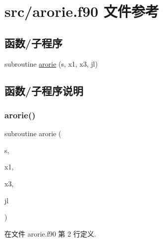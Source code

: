 \hypertarget{arorie_8f90}{}\section{src/arorie.f90 文件参考}
\label{arorie_8f90}
\subsection*{函数/子程序}
\begin{DoxyCompactItemize}
\item 
subroutine \mbox{\hyperlink{arorie_8f90_a9bf3ea44d55ee6d65228f6605eccd9fb}{arorie}} (s, x1, x3, jl)
\end{DoxyCompactItemize}


\subsection{函数/子程序说明}
\mbox{\label{arorie_8f90_a9bf3ea44d55ee6d65228f6605eccd9fb}} 
\subsubsection{\texorpdfstring{arorie()}{arorie()}}
{\footnotesize\ttfamily subroutine arorie (\begin{DoxyParamCaption}\item[{}]{s,  }\item[{}]{x1,  }\item[{}]{x3,  }\item[{}]{jl }\end{DoxyParamCaption})}



在文件 arorie.\+f90 第 2 行定义.

